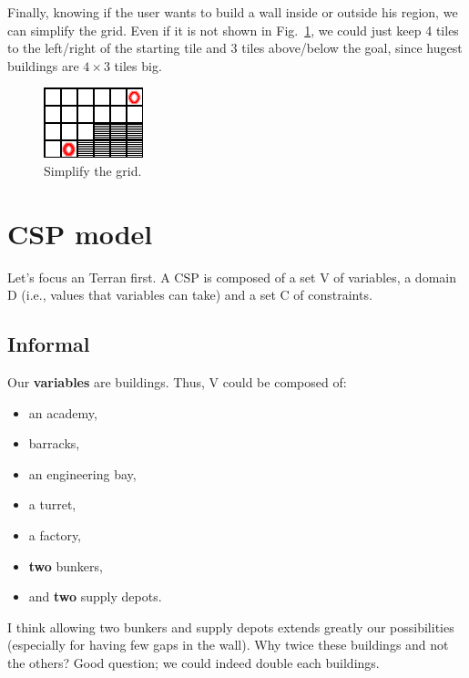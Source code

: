 \documentclass[a4paper,11pt]{article}
\begin{document}
Finally, knowing if  the user wants to build a  wall inside or outside
his  region, we can  simplify the  grid. Even  if it  is not  shown in
Fig.~\ref{figs:grid_simplified}, we could just keep 4 tiles to the
left/right  of the  starting tile  and 3  tiles above/below  the goal,
since hugest buildings are $4 \times 3$ tiles big. 

\begin{figure}[!ht]
  \centering
  \includegraphics[width=.4\linewidth]{figs/grid_simplified}
  \caption{Simplify the grid.}
  \label{figs:grid_simplified}
\end{figure}

\section{CSP model}

Let's  focus  an Terran  first.  A  CSP is  composed  of  a  set V  of
variables, a domain D (i.e., values that variables can take) and a set C
of constraints.

\subsection{Informal}

Our {\bf variables} are buildings. Thus, V could be composed of:
\begin{itemize}
\item an academy,
\item barracks,
\item an engineering bay,
\item a turret,
\item a factory,
\item {\bf two} bunkers,
\item and {\bf two} supply depots.
\end{itemize}

I think  allowing two  bunkers and supply  depots extends  greatly our
possibilities (especially for having few  gaps in the wall). Why twice
these buildings  and not  the others? Good  question; we  could indeed
double each buildings. 
\end{document}
